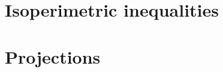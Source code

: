 \documentclass{article}
\begin{document}
\clearpage
\section{Isoperimetric inequalities}
\section{Projections}
\printindex
\end{document}
